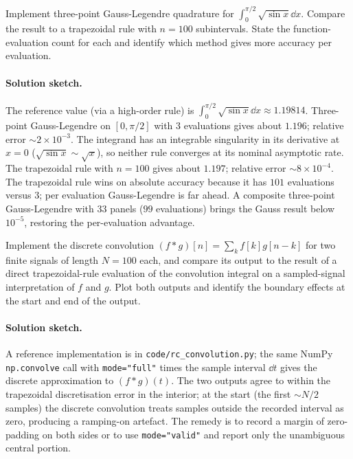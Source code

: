 \begin{exercise}
Implement three-point Gauss-Legendre quadrature for
$\int_{0}^{\pi/2} \sqrt{\sin x} \dd x$. Compare the result to a
trapezoidal rule with $n = 100$ subintervals. State the function-
evaluation count for each and identify which method gives more
accuracy per evaluation.
\end{exercise}

\paragraph{Solution sketch.}
The reference value (via a high-order rule) is
$\int_{0}^{\pi/2}\sqrt{\sin x} \dd x \approx 1.19814$. Three-point
Gauss-Legendre on $[0, \pi/2]$ with $3$ evaluations gives about
$1.196$; relative error $\sim 2 \times 10^{-3}$. The integrand
has an integrable singularity in its derivative at $x = 0$
($\sqrt{\sin x} \sim \sqrt{x}$), so neither rule converges at its
nominal asymptotic rate. The trapezoidal rule with $n = 100$
gives about $1.197$; relative error $\sim 8 \times 10^{-4}$. The
trapezoidal rule wins on absolute accuracy because it has $101$
evaluations versus $3$; per evaluation Gauss-Legendre is far
ahead. A composite three-point Gauss-Legendre with $33$ panels
($99$ evaluations) brings the Gauss result below $10^{-5}$,
restoring the per-evaluation advantage.

\begin{exercise}
Implement the discrete convolution
$(f * g)[n] = \sum_{k} f[k] g[n - k]$ for two finite signals of
length $N = 100$ each, and compare its output to the result of a
direct trapezoidal-rule evaluation of the convolution integral on
a sampled-signal interpretation of $f$ and $g$. Plot both outputs
and identify the boundary effects at the start and end of the
output.
\end{exercise}

\paragraph{Solution sketch.}
A reference implementation is in
\texttt{code/rc\_convolution.py}; the same NumPy
\texttt{np.convolve} call with \texttt{mode="full"} times the
sample interval $\dd t$ gives the discrete approximation to
$(f * g)(t)$. The two outputs agree to within the trapezoidal
discretisation error in the interior; at the start (the first
$\sim N/2$ samples) the discrete convolution treats samples
outside the recorded interval as zero, producing a ramping-on
artefact. The remedy is to record a margin of zero-padding on
both sides or to use \texttt{mode="valid"} and report only the
unambiguous central portion.

